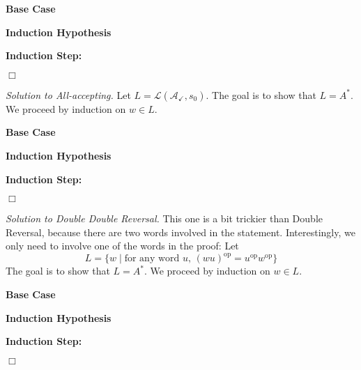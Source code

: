 \documentclass[11pt]{article}
\theoremstyle{theorem} %
\theoremstyle{definition} %
\theoremstyle{remark} %
\newcommand{\op}{\mathrm{op}}               %
\newcommand{\Lang}{\mathcal{L}}             %
\begin{document}
    \noindent\textbf{Base Case}
    
    \vspace*{5em}

    \noindent\textbf{Induction Hypothesis}

    \vspace*{10em}

    \noindent\textbf{Induction Step:}
    
\vfill\hfill\(\Box\)


\pagebreak

\noindent\emph{Solution to All-accepting.}
    Let \(L = \Lang(\mathcal A_{\checkmark}, s_0)\).
    The goal is to show that \(L = A^*\).
    We proceed by induction on \(w \in L\).
    \bigskip

    \noindent\textbf{Base Case}
    
    \vspace*{5em}

    \noindent\textbf{Induction Hypothesis}

    \vspace*{10em}

    \noindent\textbf{Induction Step:}
    
\vfill\hfill\(\Box\)

\pagebreak

\noindent\emph{Solution to Double Double Reversal.}
    This one is a bit trickier than Double Reversal, because there are two words involved in the statement. 
    Interestingly, we only need to involve one of the words in the proof:
    Let \[
        L = \{w \mid \text{for any word \(u\), \((wu)^\op = u^\op w^\op\)}\}
    \]
    The goal is to show that \(L = A^*\).
    We proceed by induction on \(w \in L\).
    \bigskip

    \noindent\textbf{Base Case}
    
    \vspace*{5em}

    \noindent\textbf{Induction Hypothesis}

    \vspace*{10em}

    \noindent\textbf{Induction Step:}
    
\vfill\hfill\(\Box\)
\end{document}

